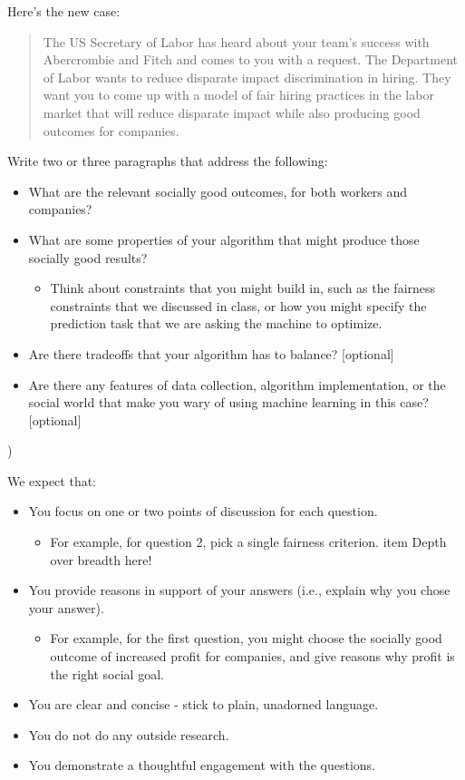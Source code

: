 \documentclass[submit]{harvardml}
\begin{document}
\begin{problem}
Here’s the new case:
\begin{quote}
The US Secretary of Labor has heard about your team's success with Abercrombie and Fitch and comes to you with a request. The Department of Labor wants to reduce disparate impact discrimination in hiring. They want you to come up with a model of fair hiring practices in the labor market that will reduce disparate impact while also producing good outcomes for companies. 
\end{quote}
Write two or three paragraphs that address the following:
\begin{itemize}
\item What are the relevant socially good outcomes, for both workers and companies?
\item What are some properties of your algorithm that might produce those socially good results?
\begin{itemize}
\item Think about constraints that you might build in, such as the fairness constraints that we discussed in class, or how you might specify the prediction task that we are asking the machine to optimize. 
\end{itemize}
\item Are there tradeoffs that your algorithm has to balance? [optional] 
\item Are there any features of data collection, algorithm implementation, or the social world that make you wary of using machine learning in this case? [optional]
\end{itemize}
)


We expect that:
\begin{itemize}
\item You focus on one or two points of discussion for each question. 
\begin{itemize}
\item For example, for question 2, pick a single fairness criterion. 
item Depth over breadth here! 
\end{itemize}
\item You provide reasons in support of your answers (i.e., explain why you chose your answer).
\begin{itemize}
\item For example, for the first question, you might choose the socially good outcome of increased profit for companies, and give reasons why profit is the right social goal.
\end{itemize}
\item You are clear and concise - stick to plain, unadorned language.  
\item You do not do any outside research. 
\item You demonstrate a thoughtful engagement with the questions. 
\end{itemize}


\end{problem}
\end{document}
